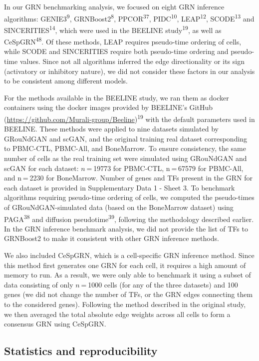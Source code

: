 In our GRN benchmarking analysis, we focused on eight GRN inference algorithms: GENIE3\textsuperscript{9}, GRNBoost2\textsuperscript{8}, PPCOR\textsuperscript{37}, PIDC\textsuperscript{10}, LEAP\textsuperscript{12}, SCODE\textsuperscript{13} and SINCERITIES\textsuperscript{14}, which were used in the BEELINE study\textsuperscript{19}, as well as CeSpGRN\textsuperscript{48}. Of these methods, LEAP requires pseudo-time ordering of cells, while SCODE and SINCERITIES require both pseudo-time ordering and pseudo-time values. Since not all algorithms inferred the edge directionality or its sign (activatory or inhibitory nature), we did not consider these factors in our analysis to be consistent among different models.

For the methods available in the BEELINE study, we ran them as docker containers using the docker images provided by BEELINE’s GitHub (\url{https://github.com/Murali-group/Beeline})\textsuperscript{19} with the default parameters used in BEELINE. These methods were applied to nine datasets simulated by GRouNdGAN and scGAN, and the original training real dataset corresponding to PBMC-CTL, PBMC-All, and BoneMarrow. To ensure consistency, the same number of cells as the real training set were simulated using GRouNdGAN and scGAN for each dataset: $n$ = 19773 for PBMC-CTL, n = 67579 for PBMC-All, and n = 2230 for BoneMarrow. Number of genes and TFs present in the GRN for each dataset is provided in Supplementary Data 1 - Sheet 3. To benchmark algorithms requiring pseudo-time ordering of cells, we computed the pseudo-times of GRouNdGAN-simulated data (based on the BoneMarrow dataset) using PAGA\textsuperscript{38} and diffusion pseudotime\textsuperscript{39}, following the methodology described earlier. In the GRN inference benchmark analysis, we did not provide the list of TFs to GRNBoost2 to make it consistent with other GRN inference methods.

We also included CeSpGRN, which is a cell-specific GRN inference method. Since this method first generates one GRN for each cell, it requires a high amount of memory to run. As a result, we were only able to benchmark it using a subset of data consisting of only $n$ = 1000 cells (for any of the three datasets) and 100 genes (we did not change the number of TFs, or the GRN edges connecting them to the considered genes). Following the method described in the original study, we then averaged the total absolute edge weights across all cells to form a consensus GRN using CeSpGRN.

\subsection*{Statistics and reproducibility}

